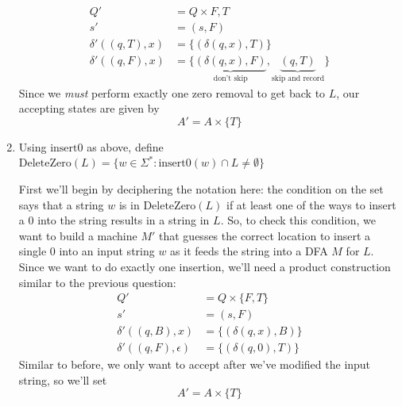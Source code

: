\documentclass[fleqn]{article}
\begin{document}
\begin{enumerate}
\begin{answer}
        \[
            \begin{aligned}
                Q' &= Q \times {F, T} \\
                s' &= (s, F) \\
                \delta'((q, T), x) &= \{(\delta(q,x), T)\} \\
                \delta'((q, F), x) &= \{\underbrace{(\delta(q,x), F)}_{\text{don't skip}}, \underbrace{(q, T)}_{\text{skip and record}}\}
            \end{aligned}
        \]
        Since we \textit{must} perform exactly one zero removal to get back to $L$, our accepting states are given by
        \[
            A' = A \times \{T\}
        \]
    \end{answer}
    \item Using $\text{insert0}$ as above, define $\text{DeleteZero}(L) = \{w \in \Sigma^* : \text{insert0}(w) \cap L \neq \emptyset\}$
    \begin{answer}
        First we'll begin by deciphering the notation here: the condition on the set says that a string $w$ is in $\text{DeleteZero}(L)$ if at least one of the ways to insert a $0$ into the string results in a string in $L$. So, to check this condition, we want to build a machine $M'$ that guesses the correct location to insert a single $0$ into an input string $w$ as it feeds the string into a DFA $M$ for $L$. Since we want to do exactly one insertion, we'll need a product construction similar to the previous question:
        \[
            \begin{aligned}
                Q' &= Q \times \{F, T\} \\
                s' &= (s, F) \\
                \delta'((q,B), x) &= \{(\delta(q,x),B)\} \\
                \delta'((q,F), \epsilon) &= \{(\delta(q, 0), T)\}
            \end{aligned}
        \]
        Similar to before, we only want to accept after we've modified the input string, so we'll set
        \[
            A' = A \times \{T\}
        \]
    \end{answer}
\end{enumerate}
\end{document}
